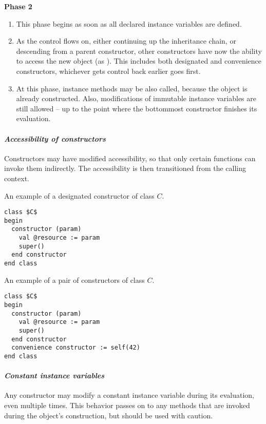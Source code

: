 {\bfseries Phase 2}
\begin{enumerate}
  \item This phase begins as soon as all declared instance variables are defined.
  \item As the control flows on, either continuing up the inheritance chain, or descending from a parent constructor, other constructors have now the ability to access the new object (as ). This includes both designated and convenience constructors, whichever gets control back earlier goes first. 
  \item At this phase, instance methods may be also called, because the object is already constructed. Also, modifications of immutable instance variables are still allowed -- up to the point where the bottommost constructor finishes its evaluation. 
\end{enumerate}

\paragraph{\em Accessibility of constructors}
Constructors may have modified accessibility, so that only certain functions can invoke them indirectly. The accessibility is then transitioned from the calling context. 

\example An example of a designated constructor of class $C$.
\begin{lstlisting}
class $C$
begin
  constructor (param)
    val @resource := param
    super()
  end constructor
end class
\end{lstlisting}

\example An example of a pair of constructors of class $C$. 
\begin{lstlisting}
class $C$
begin
  constructor (param)
    val @resource := param
    super()
  end constructor
  convenience constructor := self(42)
end class
\end{lstlisting}

\paragraph{\em Constant instance variables}
Any constructor may modify a constant instance variable during its evaluation, even multiple times. This behavior passes on to any methods that are invoked during the object's construction, but should be used with caution. 

